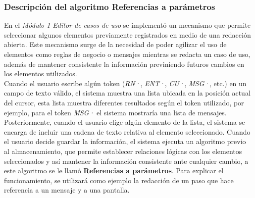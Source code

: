 	\subsubsection{Descripción del algoritmo Referencias a parámetros}
	
	En el {\it Módulo 1  Editor de casos de uso} se implementó un mecanismo que permite seleccionar algunos elementos previamente registrados en medio de una redacción abierta. Este mecanismo surge de la necesidad de poder agilizar el uso de elementos como reglas de negocio o mensajes mientras se redacta un caso de uso, además de mantener consistente la información previniendo futuros cambios en los elementos utilizados.\\
	

	Cuando el usuario escribe algún token ({\it RN·}, {\it ENT·}, {\it CU·}, {\it MSG·}, etc.) en un campo de texto válido, el sistema muestra una lista ubicada en la posición actual del cursor, esta lista muestra diferentes resultados según el token utilizado, por ejemplo, para el token {\it MSG·} el sistema mostraría una lista de mensajes. Posteriormente, cuando el usuario elige algún elemento de la lista, el sistema se encarga de incluir una cadena de texto relativa al elemento seleccionado. Cuando el usuario decide guardar la información, el sistema ejecuta un algoritmo previo al almacenamiento, que permite establecer relaciones lógicas con los elementos seleccionados y así mantener la información consistente ante cualquier cambio, a este algoritmo se le llamó {\bf Referencias a parámetros}. Para explicar el funcionamiento, se utilizará como ejemplo la redacción de un paso que hace referencia a un mensaje y a una pantalla.\\
	
